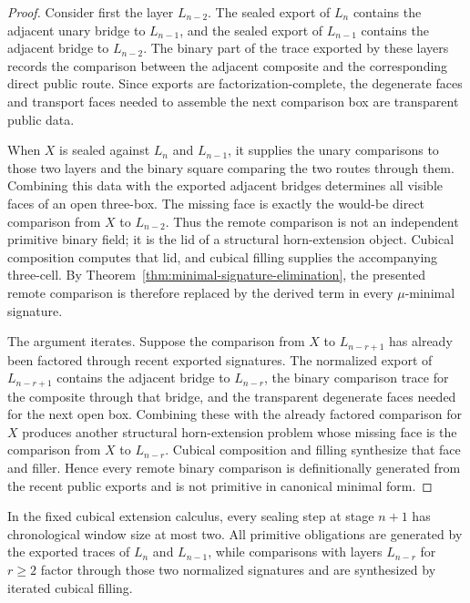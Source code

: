 \begin{proof}
Consider first the layer \(L_{n-2}\).  The sealed export of \(L_n\) contains the adjacent
unary bridge to \(L_{n-1}\), and the sealed export of \(L_{n-1}\) contains the adjacent bridge
to \(L_{n-2}\).  The binary part of the trace exported by these layers records the comparison
between the adjacent composite and the corresponding direct public route.  Since exports are
factorization-complete, the degenerate faces and transport faces needed to assemble the next
comparison box are transparent public data.

When \(X\) is sealed against \(L_n\) and \(L_{n-1}\), it supplies the unary comparisons to
those two layers and the binary square comparing the two routes through them.  Combining
this data with the exported adjacent bridges determines all visible faces of an open
three-box.  The missing face is exactly the would-be direct comparison from \(X\) to
\(L_{n-2}\).  Thus the remote comparison is not an independent primitive binary field; it is
the lid of a structural horn-extension object.  Cubical composition computes that lid, and
cubical filling supplies the accompanying three-cell.  By Theorem~\ref{thm:minimal-signature-elimination},
the presented remote comparison is therefore replaced by the derived term in every
\(\mu\)-minimal signature.

The argument iterates.  Suppose the comparison from \(X\) to \(L_{n-r+1}\) has already
been factored through recent exported signatures.  The normalized export of \(L_{n-r+1}\)
contains the adjacent bridge to \(L_{n-r}\), the binary comparison trace for the composite
through that bridge, and the transparent degenerate faces needed for the next open box.
Combining these with the already factored comparison for \(X\) produces another structural
horn-extension problem whose missing face is the comparison from \(X\) to \(L_{n-r}\).
Cubical composition and filling synthesize that face and filler.  Hence every remote binary
comparison is definitionally generated from the recent public exports and is not primitive in
canonical minimal form.
\end{proof}

\begin{corollary}
\label{cor:two-layer-window}
In the fixed cubical extension calculus, every sealing step at stage \(n+1\) has chronological
window size at most two.  All primitive obligations are generated by the exported traces of
\(L_n\) and \(L_{n-1}\), while comparisons with layers \(L_{n-r}\) for \(r\geq 2\) factor
through those two normalized signatures and are synthesized by iterated cubical filling.
\end{corollary}

